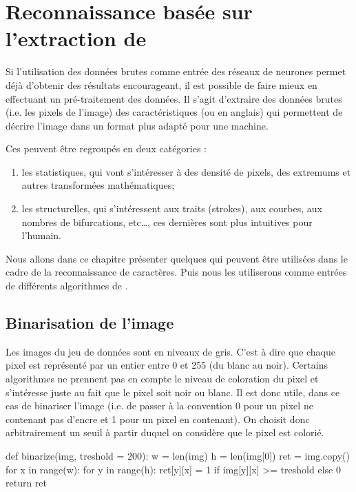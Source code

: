 
\chapter{Reconnaissance basée sur l'extraction de }




Si l'utilisation des données brutes comme entrée des réseaux de neurones 
permet déjà d'obtenir des résultats encourageant, il est possible de faire 
mieux en effectuant un pré-traitement des données. 
Il s'agit d'extraire des données brutes (i.e.\/ les pixels de l'image) des 
caractéristiques (ou  en anglais) qui permettent de décrire 
l'image dans un format plus adapté pour une machine.

\newcommand{\features}{}
Ces \features peuvent être regroupés en deux catégories : 
\begin{enumerate}
  \item les \features statistiques, qui vont s'intéresser à des densité de pixels, 
  des extremums et autres transformées mathématiques;
  \item les \features structurelles, qui s’intéressent aux traits (strokes), aux courbes,
  aux nombres de bifurcations, etc…, ces dernières sont plus intuitives pour l’humain.
\end{enumerate}

Nous allons dans ce chapitre présenter quelques \features qui peuvent être 
utilisées dans le cadre de la reconnaissance de caractères. Puis nous les utiliserons 
comme entrées de différents algorithmes de .



\section{Binarisation de l'image}



Les images du jeu de données sont en niveaux de gris. 
C'est à dire que chaque pixel est représenté par un entier entre 0 
et 255 (du blanc au noir). 
Certains algorithmes ne prennent pas en compte le niveau de coloration 
du pixel et s'intéresse juste au fait que le pixel soit noir ou blanc. 
Il est donc utile, dans ce cas de binariser l'image (i.e.\/ de passer 
à la convention 0 pour un pixel ne contenant pas d'encre et 1 pour 
un pixel en contenant). 
On choisit donc arbitrairement un seuil à partir duquel on considère que 
le pixel est colorié.

\begin{codeblock}
def binarize(img, treshold = 200):
    w = len(img)
    h = len(img[0])
    ret = img.copy()
    for x in range(w):
        for y in range(h):
            ret[y][x] = 1 if img[y][x] >= treshold else 0
    return ret
\end{codeblock}

